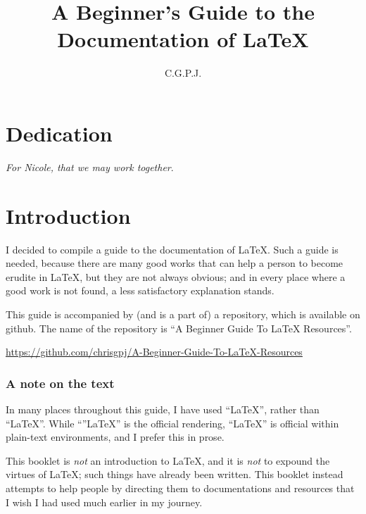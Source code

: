 \documentclass[11pt, oneside]{memoir}
\title{A Beginner's Guide to the Documentation of \LaTeX{}}
\author{C.\thinspace G.\thinspace P.\thinspace J.\thinspace}
\begin{document}
\maketitle
\thispagestyle{empty}

\RaggedRight

\chapter*{Dedication}
\emph{For Nicole, that we may work together}.

\newpage
\tableofcontents

\chapter{Introduction}
I decided to compile a guide to the documentation of \LaTeX{}. Such a guide is needed, because there are many good works that can help a person to become erudite in \LaTeX{}, but they are not always obvious; and in every place where a good work is not found, a less satisfactory explanation stands.

This guide is accompanied by (and is a part of) a repository, which is available on github. The name of the repository is ``A Beginner Guide To LaTeX Resources''.

\url{https://github.com/chrisgpj/A-Beginner-Guide-To-LaTeX-Resources}

\subsection{A note on the text}
In many places throughout this guide, I have used ``LaTeX'', rather than ``\LaTeX{}''. While ``''\LaTeX{}'' is the official rendering, ``LaTeX'' is official within plain-text environments, and I prefer this in prose.

This booklet is \emph{not} an introduction to LaTeX, and it is \emph{not} to expound the virtues of LaTeX; such things have already been written. This booklet instead attempts to help people by directing them to documentations and resources that I wish I had used much earlier in my journey.

\end{document}

